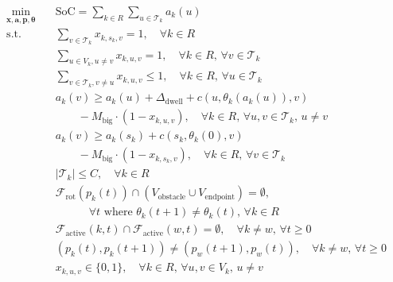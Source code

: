 \documentclass[journal]{IEEEtran}
\begin{document}
\begin{align}
\min_{\bm{x}, \bm{a}, \bm{p}, \bm{\theta}} \quad & \text{SoC} = \sum_{k \in R} \sum_{u \in \mathcal{T}_k} a_k(u) \label{eq:objective} \\
\text{s.t.} \quad & \sum_{v \in \mathcal{T}_k} x_{k, s_k, v} = 1, \quad \forall k \in R \label{eq:start_leave} \\
& \sum_{u \in V_k, u \neq v} x_{k, u, v} = 1, \quad \forall k \in R, \, \forall v \in \mathcal{T}_k \label{eq:goal_enter} \\
& \sum_{v \in \mathcal{T}_k, v \neq u} x_{k, u, v} \le 1, \quad \forall k \in R, \, \forall u \in \mathcal{T}_k \label{eq:goal_leave} \\
& a_k(v) \ge a_k(u) + \Delta_{\text{dwell}} + c(u, \theta_k(a_k(u)), v) \nonumber \\
& \quad \quad - M_{\text{big}} \cdot (1 - x_{k, u, v}), \quad \forall k \in R, \, \forall u, v \in \mathcal{T}_k, \, u \neq v \label{eq:mtz_subtour} \\
& a_k(v) \ge a_k(s_k) + c(s_k, \theta_k(0), v) \nonumber \\
& \quad \quad - M_{\text{big}} \cdot (1 - x_{k, s_k, v}), \quad \forall k \in R, \, \forall v \in \mathcal{T}_k \label{eq:start_timing} \\
& |\mathcal{T}_k| \le C, \quad \forall k \in R \label{eq:capacity_limit} \\
& \mathcal{F}_{\text{rot}}(p_k(t)) \cap \left( V_{\text{obstacle}} \cup V_{\text{endpoint}} \right) = \emptyset, \nonumber \\
& \quad \quad \quad \forall t \text{ where } \theta_k(t+1) \neq \theta_k(t), \, \forall k \in R \label{eq:rack_clearance} \\
& \mathcal{F}_{\text{active}}(k, t) \cap \mathcal{F}_{\text{active}}(w, t) = \emptyset, \quad \forall k \neq w, \, \forall t \ge 0 \label{eq:swept_collision} \\
& \left( p_k(t), p_k(t+1) \right) \neq \left( p_w(t+1), p_w(t) \right), \quad \forall k \neq w, \, \forall t \ge 0 \label{eq:edge_collision} \\
& x_{k, u, v} \in \{0, 1\}, \quad \forall k \in R, \, \forall u, v \in V_k, \, u \neq v \label{eq:integrality}
\end{align}
\end{document}
